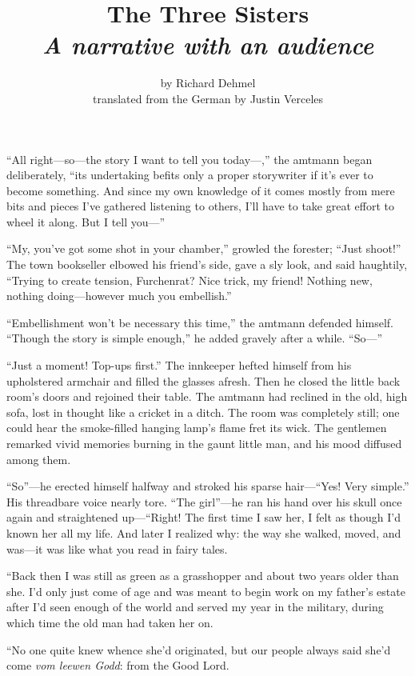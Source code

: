 \documentclass[12pt,a4paper]{article}
\title{The Three Sisters\\ \large{\textit{A narrative with an audience}}}
\author{by Richard Dehmel\\translated from the German by Justin Verceles}
\date{}
\begin{document}
\maketitle

“All right—so—the story I want to tell you today—,” the amtmann began deliberately, “its undertaking befits only a proper storywriter if it’s ever to become something. And since my own knowledge of it comes mostly from mere bits and pieces I’ve gathered listening to others, I’ll have to take great effort to wheel it along. But I tell you—”

“My, you’ve got some shot in your chamber,” growled the forester; “Just shoot!” The town bookseller elbowed his friend’s side, gave a sly look, and said haughtily, “Trying to create tension, Furchenrat? Nice trick, my friend! Nothing new, nothing doing—however much you embellish.”

“Embellishment won’t be necessary this time,” the amtmann defended himself. “Though the story is simple enough,” he added gravely after a while. “So—”

“Just a moment! Top-ups first.” The innkeeper hefted himself from his upholstered armchair and filled the glasses afresh. Then he closed the little back room’s doors and rejoined their table. The amtmann had reclined in the old, high sofa, lost in thought like a cricket in a ditch. The room was completely still; one could hear the smoke-filled hanging lamp’s flame fret its wick. The gentlemen remarked vivid memories burning in the gaunt little man, and his mood diffused among them.

“So”—he erected himself halfway and stroked his sparse hair—“Yes! Very simple.” His threadbare voice nearly tore. “The girl”—he ran his hand over his skull once again and straightened up—“Right! The first time I saw her, I felt as though I’d known her all my life. And later I realized why: the way she walked, moved, and was—it was like what you read in fairy tales.

“Back then I was still as green as a grasshopper and about two years older than she. I’d only just come of age and was meant to begin work on my father’s estate after I’d seen enough of the world and served my year in the military, during which time the old man had taken her on.

“No one quite knew whence she’d originated, but our people always said she’d come \textit{vom leewen Godd}: from the Good Lord.
\end{document}
